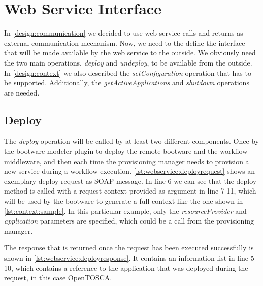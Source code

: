 \section{Web Service Interface}
\label{implementation:webservice}

In \autoref{design:communication} we decided to use web service calls and returns as external communication mechanism.
Now, we need to the define the interface that will be made available by the web service to the outside.
We obviously need the two main operations, \textit{deploy} and \textit{undeploy}, to be available from the outside.
In \autoref{design:context} we also described the \textit{setConfiguration} operation that has to be supported.
Additionally, the \textit{getActiveApplications} and \textit{shutdown} operations are needed.

\subsection{Deploy}

The \textit{deploy} operation will be called by at least two different components.
Once by the bootware modeler plugin to deploy the remote bootware and the workflow middleware, and then each time the provisioning manager needs to provision a new service during a workflow execution.
\autoref{lst:webservice:deployrequest} shows an exemplary deploy request as SOAP message.
In line 6 we can see that the deploy method is called with a request context provided as argument in line 7-11, which will be used by the bootware to generate a full context like the one shown in \autoref{lst:context:sample}.
In this particular example, only the \textit{resourceProvider} and \textit{application} parameters are specified, which could be a call from the provisioning manager.

\pagebreak

\vspace*{\baselineskip}

The response that is returned once the request has been executed successfully is shown in \autoref{lst:webservice:deployresponse}.
It contains an information list in line 5-10, which contains a reference to the application that was deployed during the request, in this case OpenTOSCA.

